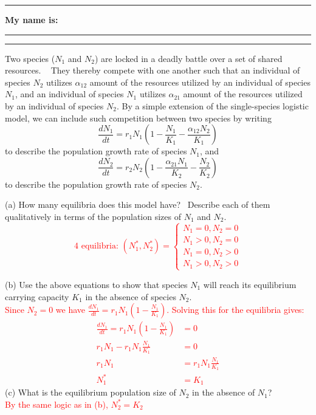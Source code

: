 \documentclass{article}
\newcommand*{\blanks}[1][4em]{\rule{#1}{.4pt}}
\begin{document}
\noindent{}

\rule[0.5ex]{\linewidth}{1pt}
\begin{center}
	\textbf{My name is:} \blanks[150pt]
\end{center}
\rule[0.5ex]{\linewidth}{1pt}

Two species ($N_1$ and $N_2$) are locked in a deadly battle over a set of shared resources.   They thereby compete with one another such that an individual of species $N_2$ utilizes $\alpha_{12}$ amount of the resources utilized by an individual of species $N_1$, and an individual of species $N_1$ utilizes $\alpha_{21}$ amount of the resources utilized by an individual of species $N_2$.  By a simple extension of the single-species logistic model, we can include such competition between two species by writing
\begin{equation*}
	\frac{dN_1}{dt}=r_1 N_1 \left( 1-\frac{N_1}{K_1}-\frac{\alpha_{12}N_2}{K_1} \right )
\end{equation*}
to describe the population growth rate of species $N_1$, and
\begin{equation*}
	\frac{dN_2}{dt}=r_2 N_2 \left( 1-\frac{\alpha_{21}N_1}{K_2}-\frac{N_2}{K_2} \right )
\end{equation*}
to describe the population growth rate of species $N_2$.

\vspace{1cm}

(a) How many equilibria does this model have?  Describe each of them qualitatively in terms of the population sizes of $N_1$ and $N_2$.\\
\textcolor{red}{
\begin{equation*}
	\text{4 equilibria:  } (N_1^*,N_2^*)=\begin{cases}
	N_1=0,N_2=0\\
	N_1>0,N_2=0\\
	N_1=0,N_2>0\\
	N_1>0,N_2>0
	\end{cases}
\end{equation*}
}

(b) Use the above equations to show that species $N_1$ will reach its equilibrium carrying capacity $K_1$ in the absence of species $N_2$.\\
\textcolor{red}{
Since $N_2=0$ we have $\frac{dN_1}{dt}=r_1 N_1 \left( 1-\frac{N_1}{K_1}\right )$.  Solving this for the equilibria gives:
\begin{align*}
	\frac{dN_1}{dt}=r_1 N_1 \left( 1-\frac{N_1}{K_1}\right ) &= 0\\
	r_1 N_1 - r_1 N_1 \frac{N_1}{K_1} & = 0\\
	r_1 N_1 &=r_1 N_1 \frac{N_1}{K_1}\\
	N_1^* &= K_1
\end{align*}
}
(c) What is the equilibrium population size of $N_2$ in the absence of $N_1$?\\
\textcolor{red}{By the same logic as in (b), $N_2^* = K_2$}
\vspace{0.5cm}
\end{document}
